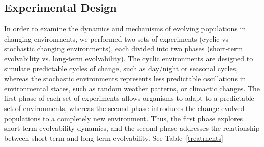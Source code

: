 \documentclass[PhD]{msu-thesis}
\begin{document}
\subsection{Experimental Design}
In order to examine the dynamics and mechanisms of evolving populations in changing environments, we performed two sets of experiments (cyclic vs stochastic changing environments), each divided into two phases (short-term evolvability vs. long-term evolvability). The cyclic environments are designed to simulate predictable cycles of change, such as day/night or seasonal cycles, whereas the stochastic environments represents less predictable oscillations in environmental states, such as random weather patterns, or climactic changes. The first phase of each set of experiments allows organisms to adapt to a predictable set of environments, whereas the second phase introduces the change-evolved populations to a completely new environment. Thus, the first phase explores short-term evolvability dynamics, and the second phase addresses the relationship between short-term and long-term evolvability. See Table~\ref{treatments}
\end{document}
